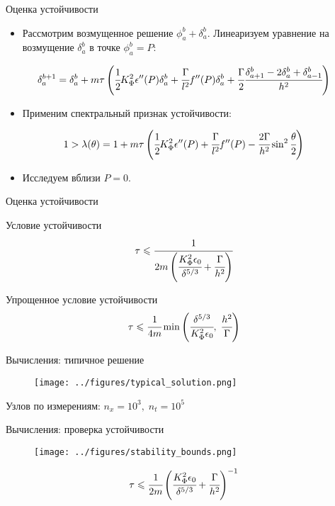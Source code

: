 \documentclass{beamer}
\begin{document}
\begin{frame}{Оценка устойчивости}
\begin{itemize}
\item Рассмотрим возмущенное решение $\phi_a^b + \delta_a^b$. Линеаризуем уравнение на возмущение
$\delta_a^b$ в точке $\phi_a^b = P$:
\end{itemize}
$$\delta_a^{b + 1} = \delta_a^b + m \tau \left( \cfrac{1}{2} K_\Phi^2 \epsilon''(P) \delta_a^b +
\cfrac{\Gamma}{l^2} f''(P) \delta_a^b + \cfrac{\Gamma}{2} \cfrac{\delta_{a + 1}^b - 2 \delta_a^b +
\delta_{a - 1}^b}{h^2} \right)$$
\begin{itemize}
\item Применим спектральный признак устойчивости:
\end{itemize}
$$1 > \lambda(\theta) = 1 + m \tau \left( \cfrac{1}{2} K_\Phi^2 \epsilon''(P) +
\cfrac{\Gamma}{l^2} f''(P) - \cfrac{2 \Gamma}{h^2} \sin^2 \cfrac{\theta}{2} \right)$$
\begin{itemize}
\item Исследуем вблизи $P = 0$.
\end{itemize}
\end{frame}


\begin{frame}{Оценка устойчивости}
\begin{block}{Условие устойчивости}
	$$\tau \leqslant \cfrac{1}{2m \left( \cfrac{K_\Phi^2 \epsilon_0}{\delta^{5/3}} +
	\cfrac{\Gamma}{h^2} \right)}$$
\end{block}
\begin{block}{Упрощенное условие устойчивости}
	$$\tau \leqslant \cfrac{1}{4m} \min \left(\cfrac{\delta^{5/3}}{K_\Phi^2 \epsilon_0}, \;
	\cfrac{h^2}{\Gamma} \right)$$
\end{block}
\end{frame}


\begin{frame}{Вычисления: типичное решение}
\vspace{-0.4cm}
\begin{figure}
	\texttt{[image: ../figures/typical\_solution.png]}
\end{figure}
\vspace{-0.8cm}
\begin{center}
	Узлов по измерениям: $n_x = 10^3, \; n_t = 10^5$
\end{center}
\end{frame}


\begin{frame}{Вычисления: проверка устойчивости}
\vspace{-0.5cm}
\begin{figure}
	\texttt{[image: ../figures/stability\_bounds.png]}
\end{figure}
\vspace{-0.3cm}
$$\tau \leqslant \cfrac{1}{2m} \left( \cfrac{K_\Phi^2 \epsilon_0}{\delta^{5/3}} +
\cfrac{\Gamma}{h^2} \right)^{-1}$$
\end{frame}
\end{document}
